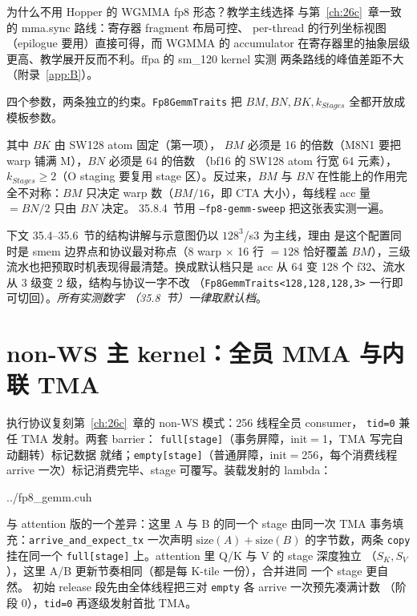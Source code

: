 为什么不用 Hopper 的 WGMMA fp8 形态？教学主线选择
与第~\ref{ch:26c}~章一致的 mma.sync 路线：寄存器 fragment 布局可控、
per-thread 的行列坐标视图（epilogue 要用）直接可得，而 WGMMA 的 accumulator
在寄存器里的抽象层级更高、教学展开反而不利。ffpa 的 sm\_120 kernel 实测
两条路线的峰值差距不大（附录~\ref{app:B}）。

四个参数，两条独立的约束。\texttt{Fp8GemmTraits} 把 $BM,BN,BK,
k_{Stages}$ 全都开放成模板参数。

其中 $BK$ 由 SW128 atom 固定（第一项），
$BM$ 必须是 16 的倍数（M8N1 要把 warp 铺满 M），$BN$ 必须是 64 的倍数
（bf16 的 SW128 atom 行宽 64 元素），$k_{Stages}\ge 2$（O staging 要复用
stage 区）。反过来，$BM$ 与 $BN$ 在性能上的作用完全不对称：$BM$ 只决定
warp 数（$BM/16$，即 CTA 大小），每线程 acc 量 $=BN/2$ 只由 $BN$ 决定。
35.8.4~节用 \texttt{--fp8-gemm-sweep} 把这张表实测一遍。

下文 35.4--35.6~节的结构讲解与示意图仍以 $128^3$/s3 为主线，理由
是这个配置同时是 smem 边界点和协议最对称点（8 warp $\times$ 16 行
$=128$ 恰好覆盖 $BM$），三级流水也把预取时机表现得最清楚。换成默认档只是
$\mathrm{acc}$ 从 64 变 128 个 f32、流水从 3 级变 2 级，结构与协议一字不改
（\texttt{Fp8GemmTraits<128,128,128,3>} 一行即可切回）。\emph{所有实测数字
（35.8~节）一律取默认档}。

\section{non-WS 主 kernel：全员 MMA 与内联 TMA}\label{sec:35-nonws}

执行协议复刻第~\ref{ch:26c}~章的 non-WS 模式：256 线程全员 consumer，
\texttt{tid=0} 兼任 TMA 发射。两套 barrier：
\texttt{full[stage]}（事务屏障，init$=$1，TMA 写完自动翻转）标记数据
就绪；\texttt{empty[stage]}（普通屏障，init$=$256，每个消费线程 arrive
一次）标记消费完毕、stage 可覆写。装载发射的 lambda：

\begin{lstinputlisting}[linerange={486-514},firstnumber=auto,
  title={fp8\_gemm.cuh L486-514（issue\_tma：单 barrier 覆盖 A+B 双字段 + 初始 release）}]{../fp8_gemm.cuh}
\end{lstinputlisting}

与 attention 版的一个差异：这里 A 与 B 的同一个 stage 由同一次
TMA 事务填充：\texttt{arrive\_and\_expect\_tx} 一次声明
$\mathrm{size}(A)+\mathrm{size}(B)$ 的字节数，两条 \texttt{copy} 挂在同一个
\texttt{full[stage]} 上。attention 里 Q/K 与 V 的 stage 深度独立
（$S_K,S_V$），这里 A/B 更新节奏相同（都是每 K-tile 一份），合并进同
一个 stage 更自然。
初始 release 段先由全体线程把三对 \texttt{empty} 各 arrive 一次预先凑满计数
（阶段 0），\texttt{tid=0} 再逐级发射首批 TMA。

